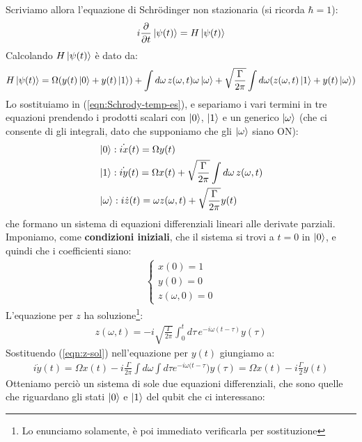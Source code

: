 \documentclass[../../InformazioneQuantistica.tex]{subfiles}
\begin{document}
Scriviamo allora l'equazione di Schr\"odinger non stazionaria (si ricorda $\hbar=1$):
\begin{align}
i\frac{\partial}{\partial t}\Ket{\psi(t)}=H\Ket{\psi(t)}
\label{eqn:Schrody-temp-es}
\end{align}
Calcolando $H\Ket{\psi(t)}$ è dato da:
\begin{align*}
H\Ket{\psi(t)} = \Omega (y(t)\Ket{0}+y(t)\Ket{1}) + \int d\omega\, z(\omega,t)\omega\Ket{\omega} + \sqrt{\frac{\Gamma}{2\pi}}\int d\omega (z(\omega, t)\Ket{1}+y(t)\Ket{\omega})
\end{align*}
Lo sostituiamo in (\ref{eqn:Schrody-temp-es}), e separiamo i vari termini in tre equazioni prendendo i prodotti scalari con $\Ket{0}$, $\Ket{1}$ e un generico $\Ket{\omega}$ (che ci consente di  gli integrali, dato che supponiamo che gli $\Ket{\omega}$ siano ON):
\begin{align*}
&\Ket{0}: \dot{ix}(t)=\Omega y(t)\\
&\Ket{1}: \dot{iy}(t)=\Omega x(t)+\sqrt{\frac{\Gamma}{2\pi}}\int d\omega\, z(\omega,t)\\
&\Ket{\omega}: i\dot{z}(t)=\omega z(\omega, t) + \sqrt{\frac{\Gamma}{2\pi}}y(t)
\end{align*}
che formano un sistema di equazioni differenziali lineari alle derivate parziali.\\
Imponiamo, come \textbf{condizioni iniziali}, che il sistema si trovi a $t=0$ in $\Ket{0}$, e quindi che i coefficienti siano:
\begin{align*}
\begin{cases}
x(0) =1\\
y(0) = 0\\
z(\omega, 0)=0
\end{cases}
\end{align*}
L'equazione per $z$ ha soluzione\footnote{Lo enunciamo solamente, è poi immediato verificarla per sostituzione}:
\begin{align}
z(\omega, t) = -i\sqrt{\frac{\Gamma}{2\pi}}\int_0^t d\tau\, e^{-i\omega(t-\tau)}y(\tau)
\label{eqn:z-sol}
\end{align}
Sostituendo (\ref{eqn:z-sol}) nell'equazione per $y(t)$ giungiamo a:
\begin{align*}
i \dot{y}(t) = \Omega x(t) - i\frac{\Gamma}{2\pi}\int d\omega \int d\tau e^{-i\omega (t-\tau}) y(\tau)= \Omega x(t) - i\frac{\Gamma}{2} y(t)
\end{align*}
Otteniamo perciò un sistema di sole due equazioni differenziali, che sono quelle che riguardano gli stati $\Ket{0}$ e $\Ket{1}$ del qubit che ci interessano:
\end{document}
